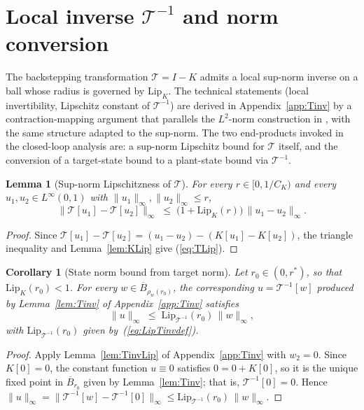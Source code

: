 \documentclass[amsthm]{autart}
\theoremstyle{plain}
\newtheorem{lemma}{Lemma}
\newtheorem{corollary}{Corollary}
\theoremstyle{definition}
\newcommand{\Tcal}{\mathcal{T}}
\newcommand{\Linf}{L^\infty}
\newcommand{\Ltwo}{L^2}
\newcommand{\Lipk}{\mathrm{Lip}_K}
\newcommand{\LipT}{\mathrm{Lip}_{\Tcal^{-1}}}
\newcommand{\Bball}{\overline{B}}
\begin{document}
\section{Local inverse $\Tcal^{-1}$ and norm conversion}\label{sec:Tinv}

The backstepping transformation $\Tcal = I - K$ admits a local sup-norm inverse on a ball whose radius is governed by $\Lipk$. The technical statements (local invertibility, Lipschitz constant of $\Tcal^{-1}$) are derived in Appendix~\ref{app:Tinv} by a contraction-mapping argument that parallels the $\Ltwo$-norm construction in \cite{krstic2026feedbacklinearizationhyperbolicpdes}, with the same structure adapted to the sup-norm. The two end-products invoked in the closed-loop analysis are: a sup-norm Lipschitz bound for $\Tcal$ itself, and the conversion of a target-state bound to a plant-state bound via $\Tcal^{-1}$.

\begin{lemma}[Sup-norm Lipschitzness of $\Tcal$]\label{lem:TLip}
For every $r \in [0, 1/C_K)$ and every $u_1, u_2 \in \Linf(0,1)$ with $\|u_1\|_\infty, \|u_2\|_\infty \le r$,
\begin{equation}
\|\Tcal[u_1] - \Tcal[u_2]\|_\infty \;\le\; \bigl(1 + \Lipk(r)\bigr)\,\|u_1 - u_2\|_\infty.
\label{eq:TLip}
\end{equation}
\end{lemma}

\begin{proof}
Since $\Tcal[u_1] - \Tcal[u_2] = (u_1 - u_2) - (K[u_1] - K[u_2])$, the triangle inequality and Lemma~\ref{lem:KLip} give (\ref{eq:TLip}).
\end{proof}

\begin{corollary}[State norm bound from target norm]\label{cor:state_from_w}
Let $r_0 \in (0, r^*)$, so that $\Lipk(r_0) < 1$. For every $w \in \Bball_{\rho_w(r_0)}$, the corresponding $u = \Tcal^{-1}[w]$ produced by Lemma~\ref{lem:Tinv} of Appendix~\ref{app:Tinv} satisfies
\begin{equation}
\|u\|_\infty \;\le\; \LipT(r_0)\,\|w\|_\infty,
\label{eq:state_from_w}
\end{equation}
with $\LipT(r_0)$ given by~(\ref{eq:LipTinvdef}).
\end{corollary}

\begin{proof}
Apply Lemma~\ref{lem:TinvLip} of Appendix~\ref{app:Tinv} with $w_2 = 0$. Since $K[0] = 0$, the constant function $u \equiv 0$ satisfies $0 = 0 + K[0]$, so it is the unique fixed point in $\Bball_{r_0}$ given by Lemma~\ref{lem:Tinv}; that is, $\Tcal^{-1}[0] = 0$. Hence $\|u\|_\infty = \|\Tcal^{-1}[w] - \Tcal^{-1}[0]\|_\infty \le \LipT(r_0)\,\|w\|_\infty$.
\end{proof}
\end{document}
